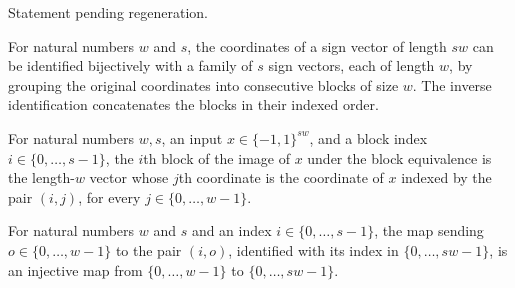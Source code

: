 \begin{theorem}
\label{FABL.eventually_totalInfluence_tribesCritical_eq_log_dimension_mul_one_add_error}
\leanok
{}
Statement pending regeneration.
\end{theorem}

\begin{definition}
\label{FABL.tribesBlockEquiv}
\leanok
{}
For natural numbers $w$ and $s$, the coordinates of a sign vector of length $sw$ can be
identified bijectively with a family of $s$ sign vectors, each of length $w$, by
grouping the original coordinates into consecutive blocks of size $w$. The inverse
identification concatenates the blocks in their indexed order.
\end{definition}

\begin{theorem}
\label{FABL.tribesBlockEquiv_apply}
\leanok
{}
For natural numbers $w,s$, an input $x\in\{-1,1\}^{sw}$, and a block index
$i\in\{0,\ldots,s-1\}$, the $i$th block of the image of $x$ under the block equivalence
is the length-$w$ vector whose $j$th coordinate is the coordinate of $x$ indexed by the
pair $(i,j)$, for every $j\in\{0,\ldots,w-1\}$.
\end{theorem}

\begin{definition}
\label{FABL.tribeOffsetEmbed}
\leanok
For natural numbers $w$ and $s$ and an index $i \in \{0,\ldots,s-1\}$, the map sending
$o \in \{0,\ldots,w-1\}$ to the pair $(i,o)$, identified with its index in
$\{0,\ldots,sw-1\}$, is an injective map from $\{0,\ldots,w-1\}$ to $\{0,\ldots,sw-1\}$.
\end{definition}

